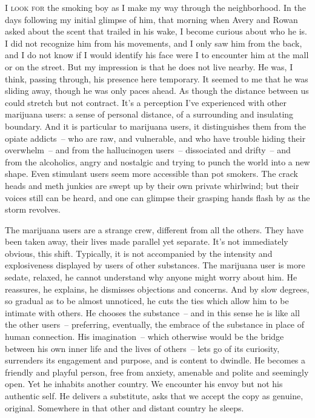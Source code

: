 \documentclass[10pt,DIV09,letterpaper,oneside,headsepline]{scrreprt}
\begin{document}
\vspace{\baselineskip}
\lettrine[nindent=2pt]{\textcolor[gray]{0.1}{I}}{ look for }
the smoking boy as I make my way through the neighborhood. In the days following my initial glimpse of him, that morning when Avery and Rowan asked about the scent that trailed in his wake, I become curious about who he is. I did not recognize him from his movements, and I only saw him from the back, and I do not know if I would identify his face were I to encounter him at the mall or on the street. But my impression is that he does not live nearby. He was, I think, passing through, his presence here temporary. It seemed to me that he was sliding away, though he was only paces ahead. As though the distance between us could stretch but not contract. It's a perception I've experienced with other marijuana users: a sense of personal distance, of a surrounding and insulating boundary. And it is particular to marijuana users, it distinguishes them from the opiate addicts~-- who are raw, and vulnerable, and who have trouble hiding their overwhelm~-- and from the hallucinogen users~-- dissociated and drifty~-- and from the alcoholics, angry and nostalgic and trying to punch the world into a new shape. Even stimulant users seem more accessible than pot smokers. The crack heads and meth junkies are swept up by their own private whirlwind; but their voices still can be heard, and one can glimpse their grasping hands flash by as the storm revolves.

The marijuana users are a strange crew, different from all the others. They have been taken away, their lives made parallel yet separate. It's not immediately obvious, this shift. Typically, it is not accompanied by the intensity and explosiveness displayed by users of other substances. The marijuana user is more sedate, relaxed, he cannot understand why anyone might worry about him. He reassures, he explains, he dismisses objections and concerns. And by slow degrees, so gradual as to be almost unnoticed, he cuts the ties which allow him to be intimate with others. He chooses the substance~-- and in this sense he is like all the other users~-- preferring, eventually, the embrace of the substance in place of human connection. His imagination~-- which otherwise would be the bridge between his own inner life and the lives of others~-- lets go of its curiosity, surrenders its engagement and purpose, and is content to dwindle. He becomes a friendly and playful person, free from anxiety, amenable and polite and seemingly open. Yet he inhabits another country. We encounter his envoy but not his authentic self. He delivers a substitute, asks that we accept the copy as genuine, original. Somewhere in that other and distant country he sleeps.
\end{document}
